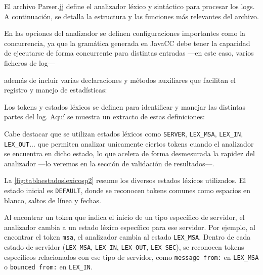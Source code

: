 \lstset{inputencoding=utf8/latin1}


El archivo Parser.jj define el analizador léxico y sintáctico para procesar los logs. A continuación, se detalla la estructura y las funciones más relevantes del archivo.

En las opciones del analizador se definen configuraciones importantes como la concurrencia, ya que la gramática generada en JavaCC debe tener la capacidad de ejecutarse de forma concurrente para distintas entradas ---en este caso, varios ficheros de log---

\lstset{inputencoding=utf8/latin1}


además de incluir varias declaraciones y métodos auxiliares que facilitan el registro y manejo de estadísticas:

\lstset{inputencoding=utf8/latin1}


Los tokens y estados léxicos se definen para identificar y manejar las distintas partes del log. Aquí se muestra un extracto de estas definiciones:

\lstset{inputencoding=utf8/latin1}


Cabe destacar que se utilizan estados léxicos como \lstinline|SERVER|, \lstinline|LEX_MSA|, \lstinline|LEX_IN|, \lstinline|LEX_OUT|... que permiten analizar unicamente ciertos tokens cuando el analizador se encuentra en dicho estado, lo que acelera de forma desmesurada la rapidez del analizador ---lo veremos en la sección de validación de resultados---.



La \autoref{fig:tablaestadoslexicosp2} resume los diversos estados léxicos utilizados. El estado inicial es \lstinline|DEFAULT|, donde se reconocen tokens comunes como espacios en blanco, saltos de línea y fechas.

Al encontrar un token que indica el inicio de un tipo específico de servidor, el analizador cambia a un estado léxico específico para ese servidor. Por ejemplo, al encontrar el token \lstinline|msa|, el analizador cambia al estado \lstinline|LEX_MSA|. Dentro de cada estado de servidor (\lstinline|LEX_MSA|, \lstinline|LEX_IN|, \lstinline|LEX_OUT|, \lstinline|LEX_SEC|), se reconocen tokens específicos relacionados con ese tipo de servidor, como \lstinline|message from:| en \lstinline|LEX_MSA| o \lstinline|bounced from:| en \lstinline|LEX_IN|.

